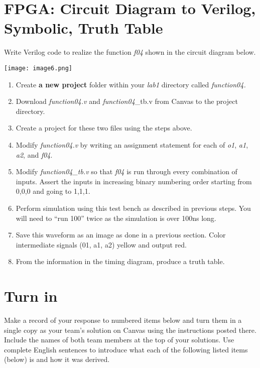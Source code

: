 \section{FPGA: Circuit Diagram to Verilog, Symbolic, Truth Table}


Write Verilog code to realize the function \emph{f04} shown in the
circuit diagram below.

\texttt{[image: image6.png]}

\begin{enumerate}
\def\labelenumi{\arabic{enumi}.}
\item
  Create \textbf{a new project} folder within your \emph{lab1} directory
  called \emph{function04.}
\item
  Download \emph{function04.v} and \emph{function04}\_tb.v from Canvas
  to the project directory.
\item
  Create a project for these two files using the steps above.
\item
  \protect\hypertarget{Part_4_Step_4}{}{}Modify \emph{function04.v} by
  writing an assignment statement for each of \emph{o1}, \emph{a1},
  \emph{a2}, and \emph{f04}.
\item
  Modify \emph{function04\_tb.v} so that \emph{f04} is run through every
  combination of inputs. Assert the inputs in increasing binary
  numbering order starting from 0,0,0 and going to 1,1,1.
\item
  Perform simulation using this test bench as described in previous
  steps. You will need to ``run 100'' twice as the simulation is over
  100ns long.
\item
  \protect\hypertarget{Part_4_Step_7}{}{}Save this waveform as an image
  as done in a previous section. Color intermediate signals (01, a1, a2)
  yellow and output red.
\item
  \protect\hypertarget{Part_4_Step_8}{}{}From the information in the
  timing diagram, produce a truth table.
\end{enumerate}


\section{Turn in}


Make a record of your response to numbered items below and turn them in
a single copy as your team's solution on Canvas using the instructions
posted there. Include the names of both team members at the top of your
solutions. Use complete English sentences to introduce what each of the
following listed items (below) is and how it was derived.

